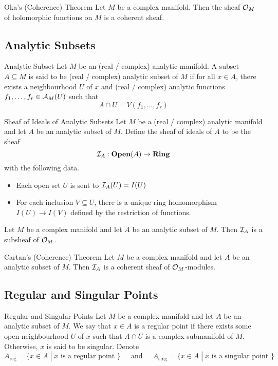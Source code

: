 \documentclass[a4paper]{article}
\begin{document}
\begin{thm}{Oka's (Coherence) Theorem}{} Let $M$ be a complex manifold. Then the sheaf $\mathcal{O}_M$ of holomorphic functions on $M$ is a coherent sheaf. 
\end{thm}

\subsection{Analytic Subsets}
\begin{defn}{Analytic Subset}{} Let $M$ be an (real / complex) analytic manifold. A subset $A\subseteq M$ is said to be (real / complex) analytic subset of $M$ if for all $x\in A$, there exists a neighbourhood $U$ of $x$ and (real / complex) analytic functions $f_1,\dots,f_r\in\mathcal{A}_M(U)$ such that $$A\cap U=V(f_1,\dots,f_r)$$
\end{defn}

\begin{defn}{Sheaf of Ideals of Analytic Subsets}{} Let $M$ be a (real / complex) analytic manifold and let $A$ be an analytic subset of $M$. Define the sheaf of ideals of $A$ to be the sheaf $$\mathcal{I}_A:\bold{Open}(A)\to\bold{Ring}$$ with the following data. 
\begin{itemize}
\item Each open set $U$ is sent to $\mathcal{I}_A(U)=I(U)$
\item For each inclusion $V\subseteq U$, there is a unique ring homomorphism $I(U)\to I(V)$ defined by the restriction of functions. 
\end{itemize}
\end{defn}

\begin{prp}{}{} Let $M$ be a complex manifold and let $A$ be an analytic subset of $M$. Then $\mathcal{I}_A$ is a subsheaf of $\mathcal{O}_M$. 
\end{prp}

\begin{thm}{Cartan's (Coherence) Theorem}{} Let $M$ be a complex manifold and let $A$ be an analytic subset of $M$. Then $\mathcal{I}_A$ is a coherent sheaf of $\mathcal{O}_M$-modules. 
\end{thm}

\subsection{Regular and Singular Points}
\begin{defn}{Regular and Singular Points}{} Let $M$ be a complex manifold and let $A$ be an analytic subset of $M$. We say that $x\in A$ is a regular point if there exists some open neighbourhood $U$ of $x$ such that $A\cap U$ is a complex submanifold of $M$. Otherwise, $x$ is said to be singular. Denote $$A_\text{reg}=\{x\in A\;|\;x\text{ is a regular point }\}\;\;\;\;\text{ and }\;\;\;\; A_\text{sing}=\{x\in A\;|\;x\text{ is a singular point }\}$$
\end{defn}
\end{document}
